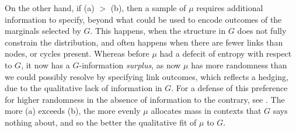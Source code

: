 \documentclass{article}
\begin{document}
On the other hand, if (a) $>$ (b), then
a sample of
$\mu$ requires additional information to specify, beyond
what could be used to encode outcomes of the marginals selected by $G$. This happens, when the structure in $G$ does not fully constrain the distribution, and often happens when there are fewer links than nodes, or cycles present. Whereas before $\mu$ had a defecit of entropy with respect to $G$, it now has a $G$-information \emph{surplus}, as now $\mu$ has more randomness than we could possibly resolve by specifying link outcomes, which reflects a hedging, due to the qualitative lack of information in $G$. For a defense of this preference for higher randomness in the absence of information to the contrary, see \cite{maxent}\cite{adversarial_protection}. The more (a) exceeds (b), the more evenly $\mu$ allocates mass in contexts that $G$ says nothing about, and so the better the qualitative fit of $\mu$ to $G$.
\end{document}
